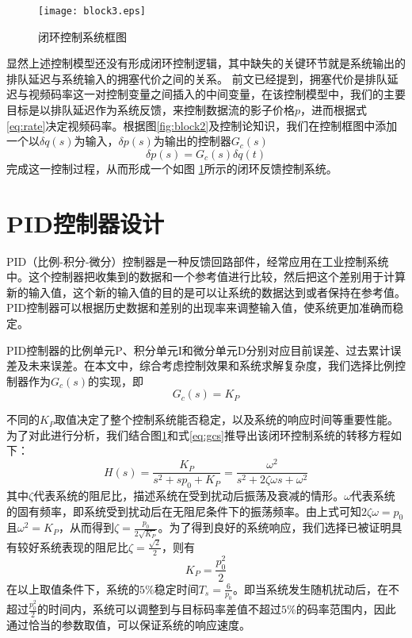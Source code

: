 \begin{figure}[htbp]
  \centering
  \texttt{[image: block3.eps]}
  \caption{闭环控制系统框图}
  \label{fig:block3}
\end{figure}

显然上述控制模型还没有形成闭环控制逻辑，其中缺失的关键环节就是系统输出的排队延迟与系统输入的拥塞代价之间的关系。
前文已经提到，拥塞代价是排队延迟与视频码率这一对控制变量之间插入的中间变量，在该控制模型中，我们的主要目标是以排队延迟作为系统反馈，来控制数据流的影子价格$p$，进而根据式 \ref{eq:rate}决定视频码率。根据图\ref{fig:block2}及控制论知识，我们在控制框图中添加一个以$\delta q(s)$为输入，$\delta p(s)$为输出的控制器$G_c(s)$
\begin{equation}
\delta p(s) = G_c(s)\delta q(t)
\label{equ_x_dif}
\end{equation}
完成这一控制过程，从而形成一个如图 \ref{fig:block3}所示的闭环反馈控制系统。

\section{PID控制器设计}
PID（比例-积分-微分）控制器是一种反馈回路部件，经常应用在工业控制系统中。这个控制器把收集到的数据和一个参考值进行比较，然后把这个差别用于计算新的输入值，这个新的输入值的目的是可以让系统的数据达到或者保持在参考值。PID控制器可以根据历史数据和差别的出现率来调整输入值，使系统更加准确而稳定。

PID控制器的比例单元P、积分单元I和微分单元D分别对应目前误差、过去累计误差及未来误差。在本文中，综合考虑控制效果和系统求解复杂度，我们选择比例控制器作为$G_c(s)$的实现，即
\begin{equation}\label{eq:gcs}
    G_c(s) = K_P
\end{equation}

不同的$K_P$取值决定了整个控制系统能否稳定，以及系统的响应时间等重要性能。为了对此进行分析，我们结合图\ref{fig:block3}和式\ref{eq:gcs}推导出该闭环控制系统的转移方程如下：
\begin{equation}\label{eq:transfer}
    H(s) = \frac{K_P}{s^2 + s p_0 + K_P} = \frac{\omega^2}{s^2 + 2 \zeta \omega s + \omega^2}
\end{equation}
其中$\zeta$代表系统的阻尼比，描述系统在受到扰动后振荡及衰减的情形。$\omega$代表系统的固有频率，即系统受到扰动后在无阻尼条件下的振荡频率。由上式可知$2 \zeta \omega = p_0$ 且$\omega^2 = K_P$，从而得到$\zeta = \frac{p_0}{2\sqrt{K_P}}$。为了得到良好的系统响应，我们选择已被证明具有较好系统表现的阻尼比$\zeta = \frac{\sqrt{2}}{2}$\cite{franklin2006feedback}，则有
\begin{equation}\label{eq:k}
    K_P = \frac{p_0^2}{2}
\end{equation}
在以上取值条件下，系统的$5\%$稳定时间$T_s = \frac{6}{p_0}$。即当系统发生随机扰动后，在不超过$\frac{p_0^2}{2}$的时间内，系统可以调整到与目标码率差值不超过$5\%$的码率范围内，因此通过恰当的参数取值，可以保证系统的响应速度。


